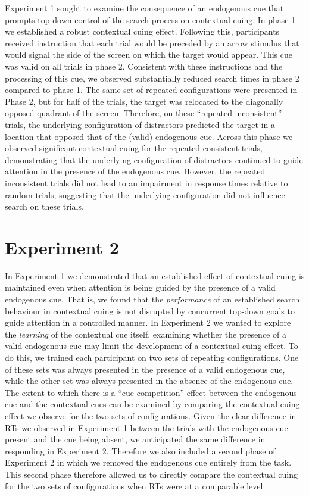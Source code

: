 \documentclass[
  man,floatsintext]{apa7}
\begin{document}
Experiment 1 sought to examine the consequence of an endogenous cue that prompts top-down control of the search process on contextual cuing. In phase 1 we established a robust contextual cuing effect. Following this, participants received instruction that each trial would be preceded by an arrow stimulus that would signal the side of the screen on which the target would appear. This cue was valid on all trials in phase 2. Consistent with these instructions and the processing of this cue, we observed substantially reduced search times in phase 2 compared to phase 1. The same set of repeated configurations were presented in Phase 2, but for half of the trials, the target was relocated to the diagonally opposed quadrant of the screen. Therefore, on these ``repeated inconsistent'' trials, the underlying configuration of distractors predicted the target in a location that opposed that of the (valid) endogenous cue. Across this phase we observed significant contextual cuing for the repeated consistent trials, demonstrating that the underlying configuration of distractors continued to guide attention in the presence of the endogenous cue. However, the repeated inconsistent trials did not lead to an impairment in response times relative to random trials, suggesting that the underlying configuration did not influence search on these trials.

\hypertarget{experiment-2}{%
\section{Experiment 2}\label{experiment-2}}

In Experiment 1 we demonstrated that an established effect of contextual cuing is maintained even when attention is being guided by the presence of a valid endogenous cue. That is, we found that the \emph{performance} of an established search behaviour in contextual cuing is not disrupted by concurrent top-down goals to guide attention in a controlled manner. In Experiment 2 we wanted to explore the \emph{learning} of the contextual cue itself, examining whether the presence of a valid endogenous cue may limit the development of a contextual cuing effect. To do this, we trained each participant on two sets of repeating configurations. One of these sets was always presented in the presence of a valid endogenous cue, while the other set was always presented in the absence of the endogenous cue. The extent to which there is a ``cue-competition'' effect between the endogenous cue and the contextual cues can be examined by comparing the contextual cuing effect we observe for the two sets of configurations. Given the clear difference in RTs we observed in Experiment 1 between the trials with the endogenous cue present and the cue being absent, we anticipated the same difference in responding in Experiment 2. Therefore we also included a second phase of Experiment 2 in which we removed the endogenous cue entirely from the task. This second phase therefore allowed us to directly compare the contextual cuing for the two sets of configurations when RTs were at a comparable level.
\end{document}
